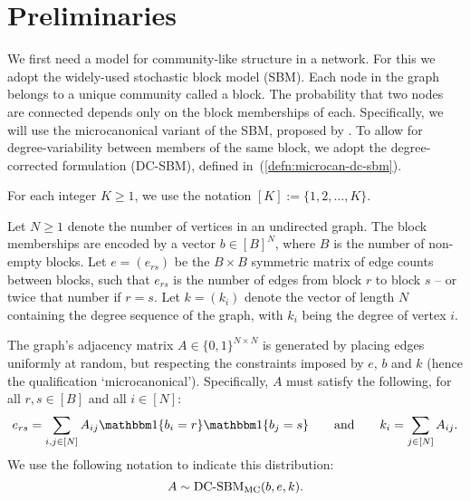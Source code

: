 \section{Preliminaries}

We first need a model for community-like structure in a network. For this we adopt the widely-used stochastic block model (SBM).
Each node in the graph belongs to a unique community called a block. The probability that two nodes are connected depends only on the block memberships of each. Specifically, we will use the microcanonical variant of the SBM, proposed by \citet{Peixoto-Bayesian-Microcanonical}. To allow for degree-variability between members of the same block, we adopt the degree-corrected formulation (DC-SBM), defined in~(\ref{defn:microcan-dc-sbm}).

For each integer $K\geq 1$, we use the notation $[K]:=\{1,2,\ldots,K\}$.

\begin{definition}
	\label{defn:microcan-dc-sbm}
	Let $N \geq 1$ denote the number of vertices in an undirected graph. The block memberships are encoded by a vector $b \in [B]^N$,
where $B$ is the number of non-empty blocks.
	Let $e=(e_{rs})$ be the $B \times B$ symmetric matrix of edge counts 
between blocks, such that $e_{rs}$ is the number of edges from block $r$ to 
block $s$ -- or twice that number if $r=s$. 
	Let $k =(k_i)$ denote the vector of length $N$ containing the degree
sequence of the graph, with $k_i$ being the degree of vertex $i$.

The graph's adjacency matrix $A \in \{0,1\}^{N \times N}$ is generated 
by placing edges uniformly at random, but respecting the constraints 
imposed by $e$, $b$ and $k$ (hence the qualification `microcanonical').
Specifically, $A$ must satisfy the following, for all $r,s\in[B]$
and all $i\in[N]$:
	\begin{equation}
		e_{rs} = \sum_{i, j \in [N]} A_{ij} 
	\one \{b_i = r\} \one \{b_j = s\} 
		\qquad 
		\textrm{and} \qquad
		k_i = \sum_{j \in [N]} A_{ij}.
		\label{eqn:sbm-constraints}
	\end{equation}
We use the following notation to indicate this distribution:
\begin{equation}
		A \sim \mbox{\rm DC-SBM}_{\rm MC} (b, e, k).
	\end{equation}
\end{definition}
